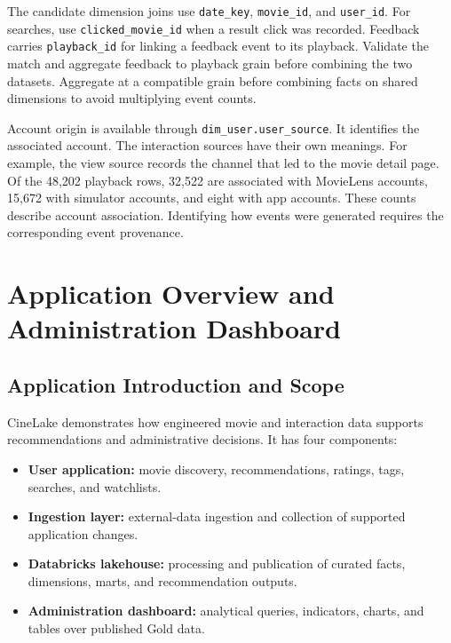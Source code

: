 \documentclass[a4paper,12pt]{article}
\begin{document}
The candidate dimension joins use \texttt{date\_key},
\texttt{movie\_id}, and \texttt{user\_id}. For searches, use
\texttt{clicked\_movie\_id} when a result click was recorded.
Feedback carries \texttt{playback\_id} for linking a feedback event
to its playback. Validate the match and aggregate feedback to
playback grain before combining the two datasets. Aggregate at a
compatible grain before combining facts on shared dimensions to
avoid multiplying event counts.

Account origin is available through \texttt{dim\_user.user\_source}.
It identifies the associated account. The interaction sources have
their own meanings. For example, the view source records the channel
that led to the movie detail page. Of the 48,202 playback rows,
32,522 are associated with MovieLens accounts, 15,672 with
simulator accounts, and eight with app accounts. These counts
describe account association. Identifying how events were generated
requires the corresponding event provenance.


\section{Application Overview and Administration Dashboard}
\label{sec:application}

\subsection{Application Introduction and Scope}

CineLake demonstrates how engineered movie and interaction data
supports recommendations and administrative decisions.
It has four components:

\begin{itemize}
  \item \textbf{User application:}
  movie discovery, recommendations, ratings, tags,
  searches, and watchlists.

  \item \textbf{Ingestion layer:}
  external-data ingestion and collection of supported
  application changes.

  \item \textbf{Databricks lakehouse:}
  processing and publication of curated facts, dimensions,
  marts, and recommendation outputs.

  \item \textbf{Administration dashboard:}
  analytical queries, indicators, charts, and tables over
  published Gold data.
\end{itemize}
\end{document}
